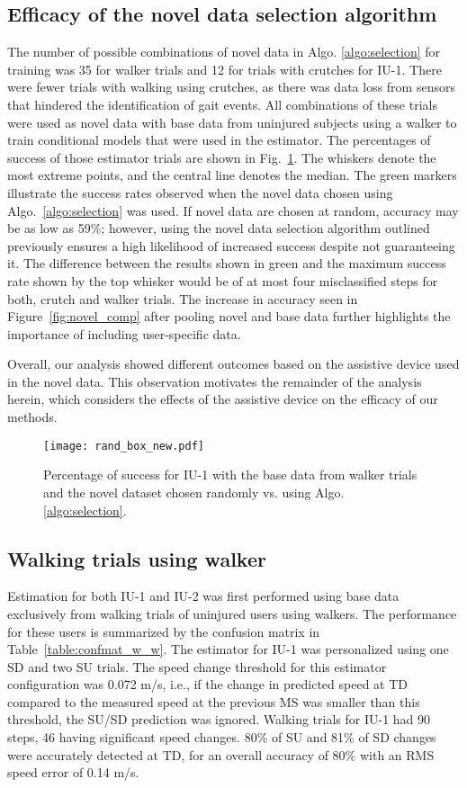 \subsection{Efficacy of the novel data selection algorithm}\label{sec:efficacy}

The number of possible combinations of novel data in Algo. \ref{algo:selection} for training was 35 for walker trials and 12 for trials with crutches for IU-1. There were fewer trials with walking using crutches, as there was data loss from sensors that hindered the identification of gait events. All combinations of these trials were used as novel data with base data from uninjured subjects using a walker to train conditional models that were used in the estimator. The percentages of success of those estimator trials are shown in Fig.~\ref{fig:rand_box}. The whiskers denote the most extreme points, and the central line denotes the median. The green markers illustrate the success rates observed when the novel data chosen using Algo.~\ref{algo:selection} was used. If novel data are chosen at random, accuracy may be as low as 59\%; however, using the novel data selection algorithm outlined previously ensures a high likelihood of increased success despite not guaranteeing it. The difference between the results shown in green and the maximum success rate shown by the top whisker would be of at most four misclassified steps for both, crutch and walker trials. The increase in accuracy seen in Figure~\ref{fig:novel_comp} after pooling novel and base data further highlights the importance of including user-specific data.

Overall, our analysis showed different outcomes based on the assistive device used in the novel data. This observation motivates the remainder of the analysis herein, which considers the effects of the assistive device on the efficacy of our methods. 

\begin{figure}
	\centering
	\texttt{[image: rand\_box\_new.pdf]}
	\caption{Percentage of success for IU-1 with the base data from walker trials and the novel dataset chosen randomly vs. using Algo. \ref{algo:selection}.}\label{fig:rand_box}
\end{figure}

\subsection{Walking trials using walker}\label{sec:ww}
Estimation for both IU-1 and IU-2 was first performed using base data exclusively from walking trials of uninjured users using walkers. The performance for these users is summarized by the confusion matrix in Table~\ref{table:confmat_w_w}. The estimator for IU-1 was personalized using one SD and two SU trials. The speed change threshold for this estimator configuration was 0.072 m/s, i.e., if the change in predicted speed at TD compared to the measured speed at the previous MS was smaller than this threshold, the SU/SD prediction was ignored. Walking trials for IU-1 had 90 steps, 46 having significant speed changes. 80\% of SU and 81\% of SD changes were accurately detected at TD, for an overall accuracy of 80\% with an RMS speed error of 0.14 m/s.

